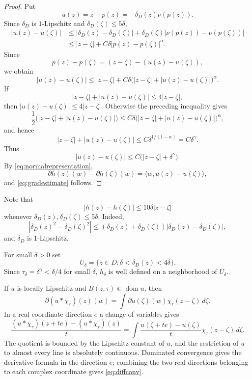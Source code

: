 \documentclass[12pt]{amsart}
\begin{document}
\begin{proof}
Put
\[
 u(z)=z-p(z)=-\delta_D(z)\nu(p(z)).
\]
Since $\delta_D$ is $1$-Lipschitz and $\delta_D(\zeta)\le5\delta$,
\[
\begin{aligned}
 |u(z)-u(\zeta)|
 &\le |\delta_D(z)-\delta_D(\zeta)|
 +\delta_D(\zeta)|\nu(p(z))-\nu(p(\zeta))|\\
 &\le |z-\zeta|+C\delta|p(z)-p(\zeta)|^\alpha.
\end{aligned}
\]
Since
\[
 p(z)-p(\zeta)=(z-\zeta)-(u(z)-u(\zeta)),
\]
we obtain
\[
 |u(z)-u(\zeta)|
 \le |z-\zeta|
 +C\delta\bigl(|z-\zeta|+|u(z)-u(\zeta)|\bigr)^\alpha.
\]
If
\[
 |z-\zeta|+|u(z)-u(\zeta)|\le4|z-\zeta|,
\]
then $|u(z)-u(\zeta)|\le4|z-\zeta|$. Otherwise the preceding inequality gives
\[
 \frac12\bigl(|z-\zeta|+|u(z)-u(\zeta)|\bigr)
 \le C\delta\bigl(|z-\zeta|+|u(z)-u(\zeta)|\bigr)^\alpha,
\]
and hence
\[
 |z-\zeta|+|u(z)-u(\zeta)|
 \le C\delta^{1/(1-\alpha)}=C\delta^\gamma.
\]
Thus
\[
 |u(z)-u(\zeta)|\le C\bigl(|z-\zeta|+\delta^\gamma\bigr).
\]
By \eqref{eq:normalrepresentation},
\[
 \partial h(z)(w)-\partial h(\zeta)(w)
 =\langle w,u(z)-u(\zeta)\rangle,
\]
and \eqref{eq:gradestimate} follows.
\end{proof}

Note that
\begin{equation}\label{eq:hosc}
 |h(z)-h(\zeta)|\le10\delta|z-\zeta|
\end{equation}
whenever $\delta_D(z),\delta_D(\zeta)\le5\delta$. Indeed,
\[
 |\delta_D(z)^2-\delta_D(\zeta)^2|
 \le(\delta_D(z)+\delta_D(\zeta))|\delta_D(z)-\delta_D(\zeta)|,
\]
and $\delta_D$ is $1$-Lipschitz.

For small $\delta>0$ set
\[
 U_\delta=\{z\in D:\delta<\delta_D(z)<4\delta\}.
\]
Since $\tau_\delta=\delta^\gamma<\delta/4$ for small $\delta$,
$h_\delta$ is well defined on a neighborhood of $U_\delta$.

If $u$ is locally Lipschitz and $B(z,\tau)\Subset\operatorname{dom}u$, then
\begin{equation}\label{eq:diffconv}
 \partial(u*\chi_\tau)(z)(w)
 =\int \partial u(\zeta)(w)\chi_\tau(z-\zeta)\,d\zeta.
\end{equation}
In a real coordinate direction $e$ a change of variables
gives
\[
 \frac{(u*\chi_\tau)(z+te)-(u*\chi_\tau)(z)}t
 =\int\frac{u(\zeta+te)-u(\zeta)}t\chi_\tau(z-\zeta)\,d\zeta.
\]
The quotient is bounded by the Lipschitz constant of $u$, and the
restriction of $u$ to almost every line is absolutely continuous.
Dominated convergence gives the derivative formula in the direction $e$;
combining the two real directions belonging to each complex coordinate
gives \eqref{eq:diffconv}.
\end{document}
